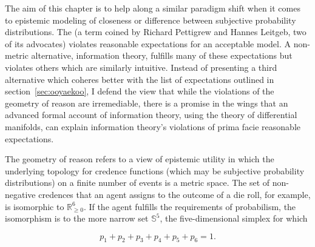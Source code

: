 \documentclass[phd,12pt,oneside]{ubcthesis}
\begin{document}
The aim of this chapter is to help along a similar paradigm shift when
it comes to epistemic modeling of closeness or difference between
subjective probability distributions. The 
(a term coined by Richard Pettigrew and Hannes Leitgeb, two of its
advocates) violates reasonable expectations for an acceptable model. A
non-metric alternative, information theory, fulfills many of these
expectations but violates others which are similarly intuitive.
Instead of presenting a third alternative which coheres better with
the list of expectations outlined in section~\ref{sec:ooyaekoo}, I
defend the view that while the violations of the geometry of reason
are irremediable, there is a promise in the wings that an advanced
formal account of information theory, using the theory of differential
manifolds, can explain information theory's violations of prima facie
reasonable expectations.

The geometry of reason refers to a view of epistemic utility in which
the underlying topology for credence functions (which may be
subjective probability distributions) on a finite number of events is
a metric space. The set of non-negative credences that an agent
assigns to the outcome of a die roll, for example, is isomorphic to
$\mathbb{R}_{\geq{}0}^{6}$. If the agent fulfills the requirements of
probabilism, the isomorphism is to the more narrow set $\mathbb{S}^5$,
the five-dimensional simplex for which

\begin{equation}
  \label{eq:simplex}
  p_{1}+p_{2}+p_{3}+p_{4}+p_{5}+p_{6}=1.
\end{equation}

\end{document}

